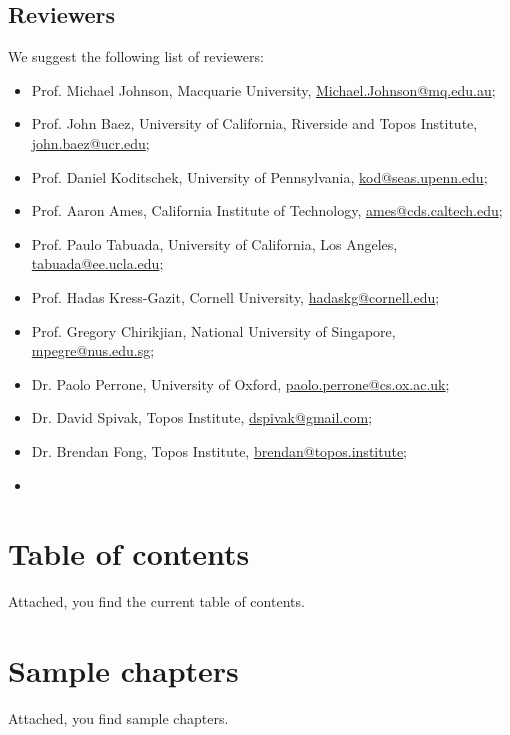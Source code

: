 \documentclass[10pt, article, one side]{memoir}
\begin{document}
    \section{Reviewers}
    We suggest the following list of reviewers:
    \begin{itemize}
        \item Prof.
              Michael Johnson, Macquarie University, \href{mailto:Michael.Johnson@mq.edu.au}{Michael.Johnson@mq.edu.au};
        \item Prof.
              John Baez, University of California, Riverside and Topos Institute, \href{mailto:john.baez@ucr.edu}{john.baez@ucr.edu};
        \item Prof.
              Daniel Koditschek, University of Pennsylvania, \href{mailto:kod@seas.upenn.edu}{kod@seas.upenn.edu};
        \item Prof.
              Aaron Ames, California Institute of Technology, \href{mailto:ames@cds.caltech.edu}{ames@cds.caltech.edu};
        \item Prof.
              Paulo Tabuada, University of California, Los Angeles, \href{mailto:tabuada@ee.ucla.edu}{tabuada@ee.ucla.edu};
        \item Prof.
              Hadas Kress-Gazit, Cornell University, \href{mailto:hadaskg@cornell.edu}{hadaskg@cornell.edu};
        \item Prof.
              Gregory Chirikjian, National University of Singapore, \href{mailto:mpegre@nus.edu.sg}{mpegre@nus.edu.sg};
        \item Dr.
              Paolo Perrone, University of Oxford, \href{mailto:paolo.perrone@cs.ox.ac.uk}{paolo.perrone@cs.ox.ac.uk};
        \item Dr.
              David Spivak, Topos Institute, \href{mailto:dspivak@gmail.com}{dspivak@gmail.com};
        \item Dr.
              Brendan Fong, Topos Institute, \href{mailto:brendan@topos.institute}{brendan@topos.institute};
        \item {}
    \end{itemize}

    \chapter{Table of contents}
    Attached, you find the current table of contents.

    \chapter{Sample chapters}
    Attached, you find sample chapters.
\end{document}

